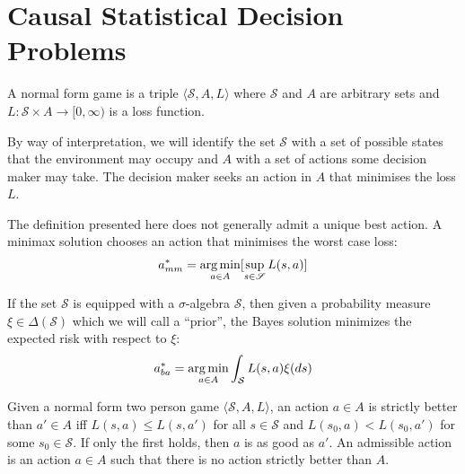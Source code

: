 \section{Causal Statistical Decision Problems}


\begin{definition}
A normal form game is a triple $\langle \mathscr{S}, A, L\rangle$ where $\mathscr{S}$ and $A$ are arbitrary sets and $L:\mathscr{S}\times A\to [0,\infty)$ is a loss function.

By way of interpretation, we will identify the set $\mathscr{S}$ with a set of possible states that the environment may occupy and $A$ with a set of actions some decision maker may take. The decision maker seeks an action in $A$ that minimises the loss $L$.
\end{definition}



The definition presented here does not generally admit a unique best action. A minimax solution chooses an action that minimises the worst case loss:
\begin{align}
    a^*_{mm} = \operatorname*{arg\,min}_{a\in A} [\sup_{s\in \mathscr{S}} L(s,a)]\label{eq:mm_soln}
\end{align}

If the set $\mathscr{S}$ is equipped with a $\sigma$-algebra $\mathcal{S}$, then given a probability measure $\xi\in \Delta(\mathcal{S})$ which we will call a ``prior'', the Bayes solution minimizes the expected risk with respect to $\xi$:
\begin{align}
    a^*_{ba} = \operatorname*{arg\,min}_{a\in A} \int_{\mathcal{S}} L(s,a) \xi(ds) \label{eq:ba_soln}
\end{align}

\begin{definition}
Given a normal form two person game $\langle \mathscr{S}, A, L\rangle$, an action $a\in A$ is strictly better than $a'\in A$ iff $L(s,a)\leq L(s,a')$ for all $s\in\mathscr{S}$ and $L(s_0,a)<L(s_0,a')$ for some $s_0\in \mathscr{S}$. If only the first holds, then $a$ is as good as $a'$. An admissible action is an action $a\in A$ such that there is no action strictly better than $A$.
\end{definition}

